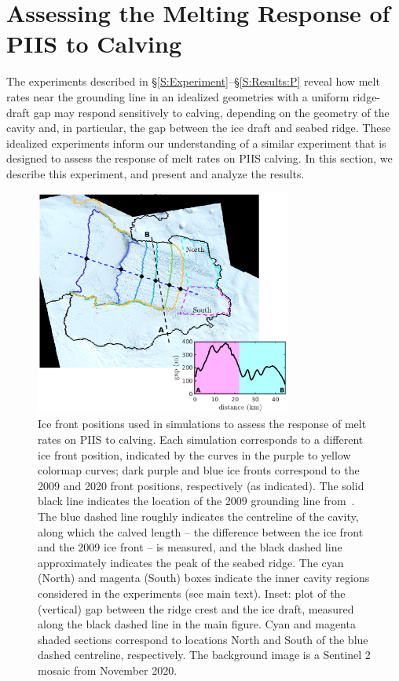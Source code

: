 \documentclass[draft]{agujournal2019}
\begin{document}
\section{Assessing the Melting Response of PIIS to Calving}\label{S:Realistic}
The experiments described in \S\ref{S:Experiment}--\S\ref{S:Results:P} reveal how melt rates near the grounding line in an idealized geometries with a uniform ridge-draft gap may respond sensitively to calving, depending on the geometry of the cavity and, in particular, the gap between the ice draft and seabed ridge. These idealized experiments inform our understanding of a similar experiment that is designed to assess the response of melt rates on PIIS calving. In this section, we describe this experiment, and present and analyze the results.

\begin{figure}
    \centering
    \includegraphics[width = 0.75\textwidth]{../make_figures/plots/figure10.eps}
    \caption{Ice front positions used in simulations to assess the response of melt rates on PIIS to calving. Each simulation corresponds to a different ice front position, indicated by the curves in the purple to yellow colormap curves; dark purple and blue ice fronts correspond to the 2009 and 2020 front positions, respectively (as indicated). The solid black line indicates the location of the 2009 grounding line from~. The blue dashed line roughly indicates the centreline of the cavity, along which the calved length -- the difference between the ice front and the 2009 ice front -- is measured, and the black dashed line approximately indicates the peak of the seabed ridge. The cyan (North) and magenta (South) boxes indicate the inner cavity regions considered in the experiments (see main text). Inset: plot of the (vertical) gap between the ridge crest and the ice draft, measured along the black dashed line in the main figure. Cyan and magenta shaded sections correspond to locations North and South of the blue dashed centreline, respectively. The background image is a Sentinel 2 mosaic from November 2020.}
    \label{fig:figure10}
\end{figure}
\end{document}
